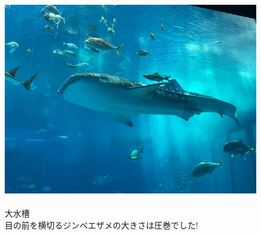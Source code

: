 \documentclass[../main]{subfiles}
\begin{document}
\begin{figure}[H]
  \begin{minipage}[b]{0.48\columnwidth}
    \caption{\\
    大水槽\\
    目の前を横切るジンベエザメの大きさは圧巻でした!
    }
  \end{minipage}
  \hspace{0.04\columnwidth} %
  \begin{minipage}[b]{0.48\columnwidth}
    \centering
    \includegraphics[width=\columnwidth]{figure/zinbeizame.jpg}
  \end{minipage}
\end{figure}
\end{document}
